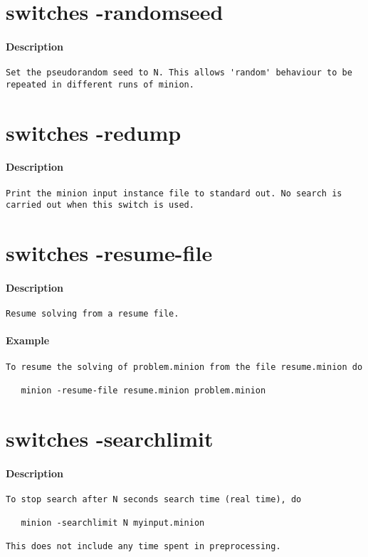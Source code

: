 \section{switches -randomseed}
\paragraph{Description}
{\footnotesize
\begin{verbatim}
Set the pseudorandom seed to N. This allows 'random' behaviour to be
repeated in different runs of minion.
\end{verbatim}
}
\section{switches -redump}
\paragraph{Description}
{\footnotesize
\begin{verbatim}
Print the minion input instance file to standard out. No search is
carried out when this switch is used.
\end{verbatim}
}
\section{switches -resume-file}
\paragraph{Description}
{\footnotesize
\begin{verbatim}
Resume solving from a resume file.
\end{verbatim}
}
\paragraph{Example}
{\footnotesize
\begin{verbatim}
To resume the solving of problem.minion from the file resume.minion do

   minion -resume-file resume.minion problem.minion
\end{verbatim}
}
\section{switches -searchlimit}
\paragraph{Description}
{\footnotesize
\begin{verbatim}
To stop search after N seconds search time (real time), do

   minion -searchlimit N myinput.minion

This does not include any time spent in preprocessing.
\end{verbatim}
}
